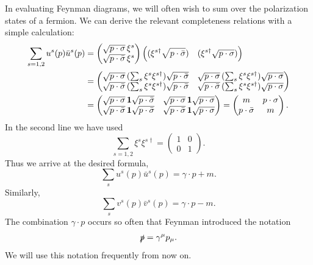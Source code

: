 In evaluating Feynman diagrams, we will often wish to sum over the
polarization states of a fermion.  We can derive the relevant completeness
relations with a simple calculation:
\begin{align}
  \sum_{s=1,2} u^s(p)\bar{u}^s(p) &=
    \begin{pmatrix}
      \sqrt{p\cdot\sigma}\,\xi^s\\
      \sqrt{p\cdot\bar{\sigma}}\,\xi^s
    \end{pmatrix}
    \Bigl( (\xi^{s\dagger}\sqrt{p\cdot\bar{\sigma}})
      \quad (\xi^{s\dagger}\sqrt{p\cdot\sigma}) \Bigr)\\
  &= \begin{pmatrix}
      \sqrt{p\cdot\sigma}\,(\sum_s \xi^s\xi^{s\dagger})\sqrt{p\cdot\bar{\sigma}}
        & \sqrt{p\cdot\sigma}\,(\sum_s \xi^s\xi^{s\dagger})\sqrt{p\cdot\sigma}\\
      \sqrt{p\cdot\bar{\sigma}}\,(\sum_s \xi^s\xi^{s\dagger})
        \sqrt{p\cdot\bar{\sigma}}
        & \sqrt{p\cdot\bar{\sigma}}\,(\sum_s \xi^s\xi^{s\dagger})
          \sqrt{p\cdot\sigma}
    \end{pmatrix}\\
  &= \begin{pmatrix}
      \sqrt{p\cdot\sigma}\,\mathbf{1}\sqrt{p\cdot\bar{\sigma}}
        & \sqrt{p\cdot\sigma}\,\mathbf{1}\sqrt{p\cdot\sigma}\\
      \sqrt{p\cdot\bar{\sigma}}\,\mathbf{1}\sqrt{p\cdot\bar{\sigma}}
        & \sqrt{p\cdot\bar{\sigma}}\,\mathbf{1}\sqrt{p\cdot\sigma}
    \end{pmatrix}
  = \begin{pmatrix}
      m & p\cdot\sigma\\
      p\cdot\bar{\sigma} & m
    \end{pmatrix}.
  \label{eq:3.68}
\end{align}
In the second line we have used
\begin{equation}
  \sum_{s=1,2}\xi^s\xi^{s\dagger} = \begin{pmatrix}1&0\\0&1\end{pmatrix}.
\end{equation}
Thus we arrive at the desired formula,
\begin{equation}
  \sum_{s} u^s(p)\bar{u}^s(p) = \gamma\cdot p + m .
  \label{eq:3.69}
\end{equation}
Similarly,
\begin{equation}
  \sum_{s} v^s(p)\bar{v}^s(p) = \gamma\cdot p - m .
  \label{eq:3.70}
\end{equation}
The combination $\gamma\cdot p$ occurs so often that Feynman introduced the
notation
\begin{equation}
  \slashed{p} = \gamma^\mu p_\mu .
  \label{eq:3.71}
\end{equation}
We will use this notation frequently from now on.

